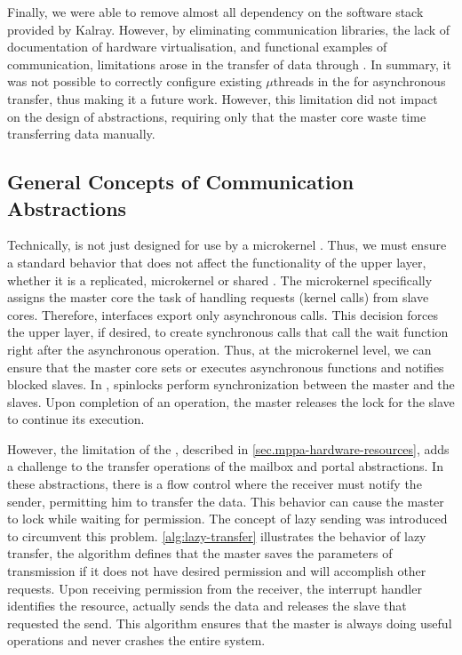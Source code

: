 			Finally, we were able to remove almost all dependency on the software
			stack provided by Kalray. However, by eliminating communication
			libraries, the lack of documentation of hardware virtualisation,
			and functional examples of communication, limitations arose
			in the transfer of data through \dnoc. In summary, it was not possible
			to correctly configure existing $\mu$threads in the \dma for asynchronous
			transfer, thus making it a future work. However, this limitation did not
			impact on the design of abstractions, requiring only that the master
			core waste time transferring data manually.

		\subsection{General Concepts of Communication Abstractions}
		\label{sec.general-concepts}

			Technically, \nanvixhal is not just designed for use by a
			microkernel \os. Thus, we must ensure a standard behavior
			that does not affect the functionality of the upper layer,
			whether it is a replicated, microkernel or shared \os. The
			microkernel specifically assigns the master core the task
			of handling requests (\ie kernel calls) from slave cores. Therefore,
			interfaces export only asynchronous calls. This decision forces
			the upper layer, if desired, to create synchronous calls that
			call the wait function right after the asynchronous operation.
			Thus, at the microkernel level, we can ensure that the
			master core
			sets or executes asynchronous functions and notifies blocked
			slaves. In \mppa, spinlocks perform synchronization between the
			master and the slaves. Upon completion of an operation, the master
			releases the lock for the slave to continue its execution.

			However, the limitation of the \dma, described in
			\autoref{sec.mppa-hardware-resources}, adds a challenge to the
			transfer operations of the mailbox and portal abstractions.
			In these abstractions, there is a flow control where the receiver
			must notify the sender, permitting him to transfer the data. This
			behavior can cause the master to lock while waiting for permission.
			The concept of lazy sending was introduced to circumvent this
			problem. \autoref{alg:lazy-transfer} illustrates the behavior of
			lazy transfer, the algorithm defines that the master saves the
			parameters of transmission if it does not have desired permission
			and will accomplish other requests. Upon receiving permission
			from the receiver, the interrupt handler identifies the resource,
			actually sends the data and releases the slave that requested the
			send. This algorithm ensures that the master is always doing useful
			operations and never crashes the entire system.

